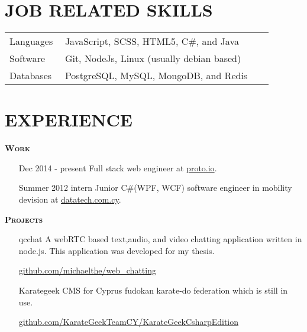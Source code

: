 \documentclass[margin, 10pt]{res} %
\begin{document}
\begin{resume}
\begin{tabular}{p{0.2\linewidth} p{0.75\linewidth}}
\end{tabular}

\section{JOB RELATED SKILLS}

\begin{tabular}{p{0.2\linewidth} p{0.75\linewidth}}

Languages & JavaScript, SCSS, HTML5, C\#, and Java \\
Software & Git, NodeJs, Linux (usually debian based) \\
Databases & PostgreSQL, MySQL, MongoDB, and Redis

\end{tabular}

\section{EXPERIENCE}

\textsc{ \textbf{Work}}

\begin{itemize}

\item[Dec 2014 - present] Full stack web engineer at
\href{https://proto.io/}{proto.io}. \\

\item[Summer 2012 intern] Junior C\#(WPF, WCF) software engineer in mobility devision at
\href{http://www.datatech.com.cy/}{datatech.com.cy}. \\

\end{itemize}

\textsc{ \textbf{Projects}}

\begin{itemize}

\item[qcchat] A webRTC based text,audio, and video chatting application written in node.js.
This application was developed for my thesis.

\href{https://github.com/michaelthe/web_chatting}{github.com/michaelthe/web\_chatting} \\

\item[Karategeek] CMS for Cyprus fudokan karate-do federation which is still in use.

\href{https://github.com/KarateGeekTeamCY/KarateGeekCsharpEdition/tree/baseV4.5.1}{github.com/KarateGeekTeamCY/KarateGeekCsharpEdition} \\


\end{itemize}
\end{resume}
\end{document}
